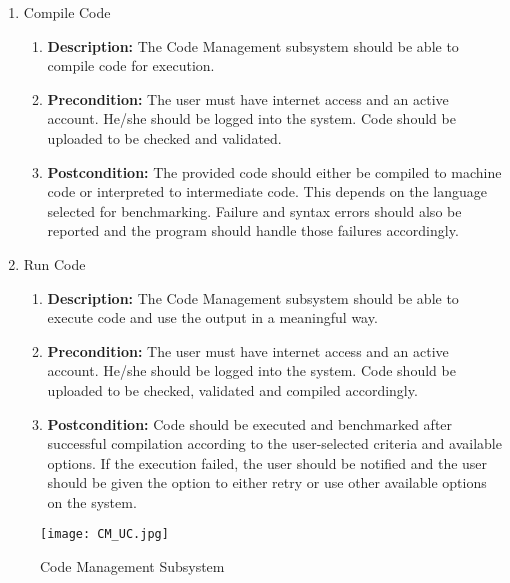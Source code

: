 \documentclass{article}
\begin{document}
\begin{enumerate}
\begin{enumerate}
        \item Compile Code
		\begin{enumerate}
			\item \textbf{Description:} The Code Management subsystem should be able to compile code for execution.
			\item \textbf{Precondition:} The user must have internet access and an active account. He/she should be logged into the system. Code should be uploaded to be checked and validated.
			\item \textbf{Postcondition:} The provided code should either be compiled to machine code or interpreted to intermediate code. This depends on the language selected for benchmarking. Failure and syntax errors should also be reported and the program should handle those failures accordingly.\newline
		\end{enumerate}
        
        \item Run Code
		\begin{enumerate}
			\item \textbf{Description:} The Code Management subsystem should be able to execute code and use the output in a meaningful way.
			\item \textbf{Precondition:} The user must have internet access and an active account. He/she should be logged into the system. Code should be uploaded to be checked, validated and compiled accordingly.
			\item \textbf{Postcondition:} Code should be executed and benchmarked after successful compilation according to the user-selected criteria and available options. If the execution failed, the user should be notified and the user should be given the option to either retry or use other available options on the system.\newline
		\end{enumerate}
        
   \end{enumerate}
        
        
        \begin{figure}[H]
    	\texttt{[image: CM\_UC.jpg]}
        \centering
		\caption{Code Management Subsystem}	
	\end{figure}	
    

\end{enumerate}
\end{document}
